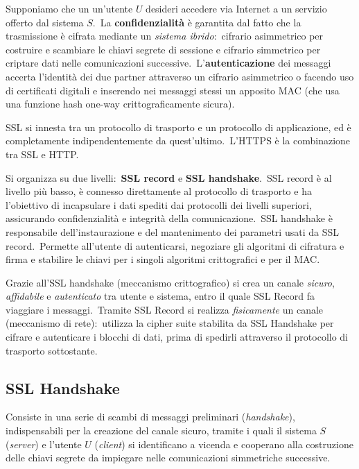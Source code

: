 Supponiamo che un un'utente $U$ desideri accedere via Internet a un servizio offerto dal sistema $S$.\
La \textbf{confidenzialità} è garantita dal fatto che la trasmissione è cifrata mediante un \textit{sistema ibrido}:\ cifrario asimmetrico per costruire e scambiare le chiavi segrete di sessione e cifrario simmetrico per criptare dati nelle comunicazioni successive.\
L'\textbf{autenticazione} dei messaggi accerta l'identità dei due partner attraverso un cifrario asimmetrico o facendo uso di certificati digitali e inserendo nei messaggi stessi un apposito MAC (che usa una funzione hash one-way crittograficamente sicura).

SSL si innesta tra un protocollo di trasporto e un protocollo di applicazione, ed è completamente indipendentemente da quest'ultimo.\
L'HTTPS è la combinazione tra SSL e HTTP.\

Si organizza su due livelli:\ \textbf{SSL record} e \textbf{SSL handshake}.\
SSL record è al livello più basso, è connesso direttamente al protocollo di trasporto e ha l'obiettivo di incapsulare i dati spediti dai protocolli dei livelli superiori, assicurando confidenzialità e integrità della comunicazione.\
SSL handshake è responsabile dell'instaurazione e del mantenimento dei parametri usati da SSL record.\
Permette all'utente di autenticarsi, negoziare gli algoritmi di cifratura e firma e stabilire le chiavi per i singoli algoritmi crittografici e per il MAC.\

Grazie all'SSL handshake (meccanismo crittografico) si crea un canale \textit{sicuro}, \textit{affidabile} e \textit{autenticato} tra utente e sistema, entro il quale SSL Record fa viaggiare i messaggi.\
Tramite SSL Record si realizza \textit{fisicamente} un canale (meccanismo di rete):\ utilizza la cipher suite stabilita da SSL Handshake per cifrare e autenticare i blocchi di dati, prima di spedirli attraverso il protocollo di trasporto sottostante.\

\subsection{SSL Handshake}

Consiste in una serie di scambi di messaggi preliminari (\textit{handshake}), indispensabili per la creazione del canale sicuro, tramite i quali il sistema $S$ (\textit{server}) e l'utente $U$ (\textit{client}) si identificano a vicenda e cooperano alla costruzione delle chiavi segrete da impiegare nelle comunicazioni simmetriche successive.\

